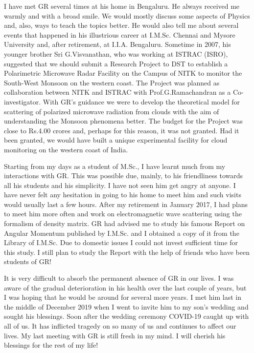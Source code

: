 I have met GR several times at his home in Bengaluru. He always received me warmly and with a broad smile. We would mostly discuss some aspects of Physics and, also, ways to teach the topics better. He would also tell me about several events that happened in his illustrious career at I.M.Sc. Chennai and Mysore University and, after retirement, at I.I.A. Bengaluru. Sometime in 2007, his younger brother Sri G.Visvanathan, who was working at ISTRAC (ISRO), suggested that we should submit a Research Project to DST to establish a Polarimetric Microwave Radar Facility on the Campus of NITK to monitor the South-West Monsoon on the western coast. The Project was planned as collaboration between NITK and ISTRAC with Prof.G.Ramachandran as a Co-investigator. With GR's guidance we were to develop the theoretical model for scattering of polarized microwave radiation from clouds with the aim of understanding the Monsoon phenomena better. The budget for the Project was close to Rs.4.00 crores and, perhaps for this reason, it was not granted. Had it been granted, we would have built a unique experimental facility for cloud monitoring on the western coast of India.

Starting from my days as a student of M.Sc., I have learnt much from my interactions with GR. This was possible due, mainly, to his friendliness towards all his students and his simplicity. I have not seen him get angry at anyone. I have never felt any hesitation in going to his home to meet him and such visits would usually last a few hours. After my retirement in January 2017, I had plans to meet him more often and work on electromagnetic wave scattering using the formalism of density matrix. GR had advised me to study his famous Report on Angular Momentum published by I.M.Sc. and I obtained a copy of it from the Library of I.M.Sc. Due to domestic issues I could not invest sufficient time for this study. I still plan to study the Report with the help of friends who have been students of GR!

It is very difficult to absorb the permanent absence of GR in our lives. I was aware of the gradual deterioration in his health over the last couple of years, but I was hoping that he would be around for several more years. I met him last in the middle of December 2019 when I went to invite him to my son's wedding and sought his blessings. Soon after the wedding ceremony COVID-19 caught up with all of us. It has inflicted tragedy on so many of us and continues to affect our lives. My last meeting with GR is still fresh in my mind. I will cherish his blessings for the rest of my life!


